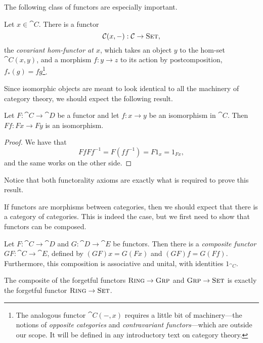 The following class of functors are especially important.

\begin{dfn}\label{def:hom-functors}
  Let $x\in\cat{C}$. There is a functor \[
    {\mathcal{C}}(x, -):{\mathcal{C}}\to{\textsc{\text{Set}}},
  \] the \emph{covariant hom-functor at $x$}, which takes an object $y$ to the
  hom-set $\cat{C}(x, y)$, and a morphism $f: y\to z$ to its action by
  postcomposition, $f_*(g) = fg$\footnote{The analogous functor $\cat{C}(-, x)$
    requires a little bit of machinery---the notions of \emph{opposite
  categories} and \emph{contravariant functors}---which are outside our scope.
  It will be defined in any introductory text on category theory.}.
\end{dfn}

Since isomorphic objects are meant to look identical to all the machinery of
category theory, we should expect the following result.

\begin{prop}
  Let $F: \cat{C}\to\cat{D}$ be a functor and let $f: x\to y$ be an isomorphism
  in $\cat{C}$. Then $Ff: Fx\to Fy$ is an isomorphism.
\end{prop}

\begin{proof}
  We have that \[
    FfFf^{-1} = F(ff^{-1}) = F1_x = 1_{Fx},
  \]and the same works on the other side.
\end{proof}

Notice that both functorality axioms are exactly what is required to prove this
result.

\vspace{1em}

If functors are morphisms between categories, then we should expect that there
is a category of categories. This is indeed the case, but we first need to show
that functors can be composed.

\begin{prop}
  Let $F: \cat{C}\to\cat{D}$ and $G: \cat{D}\to\cat{E}$ be functors. Then there
  is a \emph{composite functor} $GF: \cat{C}\to\cat{E}$, defined by $(GF)x =
  G(Fx)$ and $(GF)f = G(Ff)$. Furthermore, this composition is associative and
  unital, with identities $1_{\cat{C}}$.
\end{prop}

\begin{ex}
  The composite of the forgetful functors ${\textsc{\text{Ring}}}\to{\textsc{\text{Grp}}}$ and
  ${\textsc{\text{Grp}}}\to{\textsc{\text{Set}}}$ is exactly the forgetful functor
  ${\textsc{\text{Ring}}}\to{\textsc{\text{Set}}}$.
\end{ex}


